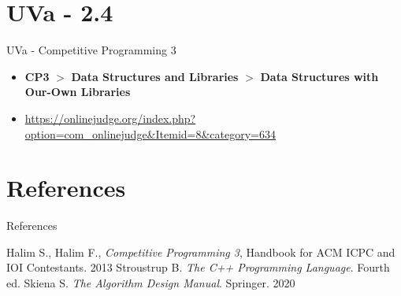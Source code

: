 \documentclass{beamer}
\begin{document}
\section{UVa - 2.4}
\begin{frame}{UVa - Competitive Programming 3}
    \begin{itemize}
        \item \textbf{CP3} $>$ \textbf{Data Structures and Libraries} $>$ \textbf{Data Structures with Our-Own Libraries}
        \item \url{https://onlinejudge.org/index.php?option=com_onlinejudge&Itemid=8&category=634}
    \end{itemize}
\end{frame}


    

    


\section*{References}
\begin{frame}{References}
    \begin{thebibliography}{}
         Halim S., Halim F., \textit{Competitive Programming 3}, Handbook for ACM ICPC and IOI Contestants. 2013
         Stroustrup B. \textit{The C++ Programming Language}. Fourth ed. 
         Skiena S. \textit{The Algorithm Design Manual}. Springer. 2020
    \end{thebibliography}
\end{frame}
\end{document}
